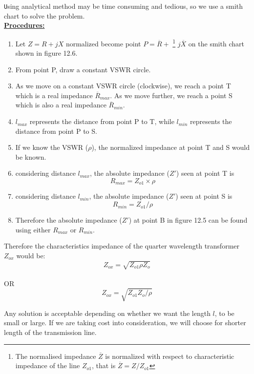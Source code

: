 \verb|U|sing analytical method may be time consuming and tedious, so we use a smith chart to solve the problem.\\ 
\underline{\textbf{ Procedures:}}
\begin{enumerate}
\item Let $ Z = R + jX$ normalized become point $ P= \overline{R} +$ \footnote{The normalised impedance $ \overline{Z}$ is normalized with respect to characteristic impedance of the line $ Z_{o1}$, that is $ \overline{Z} = Z/ Z_{o1}$} $j\overline{X}$  on the smith chart shown in figure 12.6.
\item  From point P, draw a constant VSWR circle.
\item As we move on a constant VSWR circle (clockwise), we reach a point T which is a real impedance $\overline{R}_{max}$. As we move further, we reach a point S which is also a real impedance $\overline{R}_{min}$.
\item $ l_{max}$ represents the distance from point P to T, while $ l_{min}$ represents the distance from point P to S.
\item If we know the VSWR ($\rho$), the normalized impedance at point T and S would be known.
\item considering distance  $ l_{max}$, the absolute impedance ($ Z'$) seen at point T is \begin{equation}R_{max} = Z_{o1}\times\rho
\end{equation}
\item considering distance  $ l_{min}$, the absolute impedance ($ Z'$) seen at point S is\begin{equation} R_{min} = Z_{o1}/\rho\end{equation}
\item Therefore the absolute impedance ($Z'$) at point B in figure 12.5 can be found using either $ R_{max}$ or $ R_{min}$.
\end{enumerate}

Therefore the characteristics impedance of the quarter wavelength transformer $Z_{ox}$ would be: 
\begin{equation}
\boxed{Z_{ox}=\sqrt{Z_{o1}\rho Z_o}} 
\end{equation}
\\OR
\begin{equation}
\boxed{Z_{ox}=\sqrt{Z_{o1}Z_o/\rho}}
\end{equation}

Any solution is acceptable depending on whether we want the length $l$, to be small or large. If we are taking cost into consideration, we will choose for shorter length of the transmission line.\\

